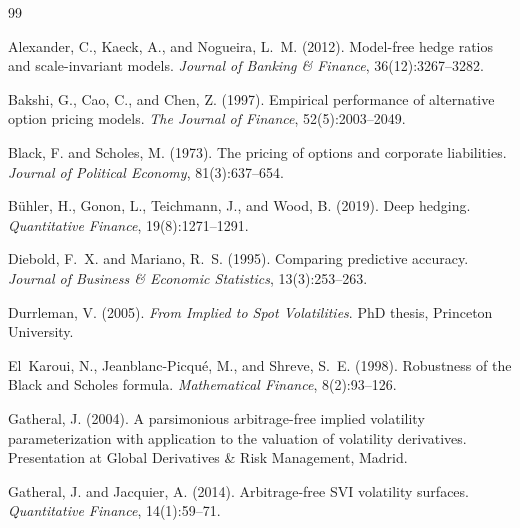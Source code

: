 \documentclass[12pt, letterpaper]{article}
\begin{document}
\newpage


\begin{thebibliography}{99}

Alexander, C., Kaeck, A., and Nogueira, L.~M. (2012).
\newblock Model-free hedge ratios and scale-invariant models.
\newblock \textit{Journal of Banking \& Finance}, 36(12):3267--3282.

Bakshi, G., Cao, C., and Chen, Z. (1997).
\newblock Empirical performance of alternative option pricing models.
\newblock \textit{The Journal of Finance}, 52(5):2003--2049.

Black, F. and Scholes, M. (1973).
\newblock The pricing of options and corporate liabilities.
\newblock \textit{Journal of Political Economy}, 81(3):637--654.

B{\"u}hler, H., Gonon, L., Teichmann, J., and Wood, B. (2019).
\newblock Deep hedging.
\newblock \textit{Quantitative Finance}, 19(8):1271--1291.

Diebold, F.~X. and Mariano, R.~S. (1995).
\newblock Comparing predictive accuracy.
\newblock \textit{Journal of Business \& Economic Statistics}, 13(3):253--263.

Durrleman, V. (2005).
\newblock \textit{From Implied to Spot Volatilities}.
\newblock PhD thesis, Princeton University.

El~Karoui, N., Jeanblanc-Picqu{\'e}, M., and Shreve, S.~E. (1998).
\newblock Robustness of the {Black} and {Scholes} formula.
\newblock \textit{Mathematical Finance}, 8(2):93--126.

Gatheral, J. (2004).
\newblock A parsimonious arbitrage-free implied volatility parameterization with application to the valuation of volatility derivatives.
\newblock Presentation at Global Derivatives \& Risk Management, Madrid.

Gatheral, J. and Jacquier, A. (2014).
\newblock Arbitrage-free {SVI} volatility surfaces.
\newblock \textit{Quantitative Finance}, 14(1):59--71.


\end{thebibliography}
\end{document}
